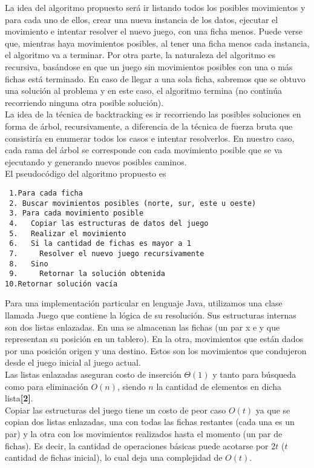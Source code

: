\documentclass[10pt, a4paper,english,spanish]{article}
\begin{document}
La idea del algoritmo propuesto será ir listando todos los posibles movimientos y para cada uno de ellos, crear una
nueva instancia de los datos, ejecutar el movimiento e intentar resolver el nuevo juego, con una ficha menos. Puede verse
que, mientras haya movimientos posibles, al tener una ficha menos cada instancia, el algoritmo va a terminar. Por otra parte,
la naturaleza del algoritmo es recursiva, basándose en que un juego sin movimientos posibles con una o más fichas está terminado.
En caso de llegar a una sola ficha, sabremos que se obtuvo una solución al problema y en este caso, el algoritmo termina (no continúa
recorriendo ninguna otra posible solución). \\
\indent La idea de la técnica de backtracking es ir recorriendo las posibles soluciones en forma de árbol, recursivamente, a diferencia
de la técnica de fuerza bruta que consistiría en enumerar todos los casos e intentar resolverlos. En nuestro caso, cada rama del árbol
se corresponde con cada movimiento posible que se va ejecutando y generando nuevos posibles caminos. \\

El pseudocódigo del algoritmo propuesto es

\begin{verbatim}
 1.Para cada ficha 
 2. Buscar movimientos posibles (norte, sur, este u oeste)
 3. Para cada movimiento posible
 4.   Copiar las estructuras de datos del juego
 5.   Realizar el movimiento
 6.   Si la cantidad de fichas es mayor a 1
 7.     Resolver el nuevo juego recursivamente
 8.   Sino
 9.     Retornar la solución obtenida
10.Retornar solución vacía
\end{verbatim}

Para una implementación particular en lenguaje Java, utilizamos una clase llamada Juego
que contiene la lógica de su resolución. Sus estructuras internas son dos listas enlazadas. En una 
se almacenan las fichas (un par x e y que representan su posición en un tablero). En la otra,
movimientos que están dados por una posición origen y una destino. Estos son los movimientos que condujeron
desde el juego inicial al juego actual.\\
Las listas enlazadas aseguran costo de inserción $\Theta(1)$ y tanto para búsqueda como para
eliminación $O(n)$, siendo $n$ la cantidad de elementos en dicha lista\textbf{[2]}. \\

\indent Copiar las estructuras del juego tiene un costo de peor caso $O(t)$ ya que se copian dos listas enlazadas,
una con todas las fichas restantes (cada una es un par) y la otra con los movimientos realizados hasta el momento 
(un par de fichas). Es decir, la cantidad de operaciones básicas puede acotarse por $2t$ 
($t$ cantidad de fichas inicial), lo cual deja una complejidad de $O(t)$. \\
\end{document}

